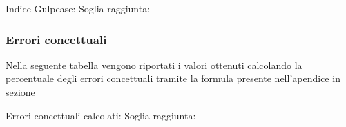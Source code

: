 Indice Gulpease:
Soglia raggiunta:

\subsubsection{Errori concettuali}

Nella seguente tabella vengono riportati i valori ottenuti calcolando la percentuale degli errori concettuali tramite la formula presente nell'apendice in sezione ~


Errori concettuali calcolati:
Soglia raggiunta:
